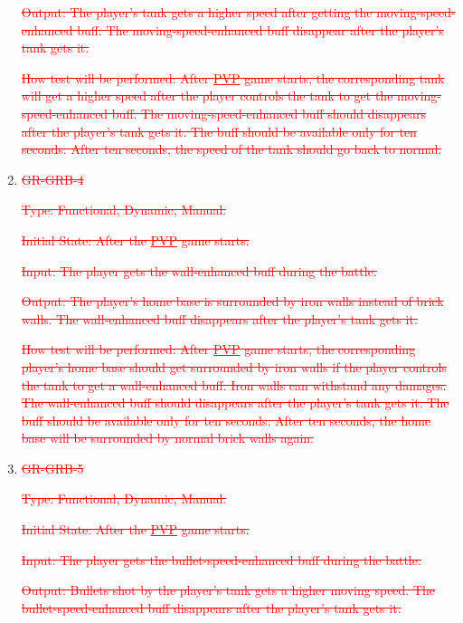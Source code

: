 \documentclass[12pt, titlepage]{article}
\begin{document}
\begin{enumerate}
\textcolor{red}{\sout{Output: The player's tank gets a higher speed after getting the moving-speed-enhanced buff. The moving-speed-enhanced buff disappear after the player's tank gets it.}}
					
\textcolor{red}{\sout{How test will be performed: After \underline{PVP} game starts, the corresponding tank will get a higher speed after the player controls the tank to get the moving-speed-enhanced buff. The moving-speed-enhanced buff should disappears after the player's tank gets it. The buff should be available only for ten seconds. After ten seconds, the speed of the tank should go back to normal.}}


\item{\textcolor{red}{\sout{GR-GRB-4}}\\}

\textcolor{red}{\sout{Type: Functional, Dynamic, Manual.}}
					
\textcolor{red}{\sout{Initial State: After the \underline{PVP} game starts. }}
					
\textcolor{red}{\sout{Input: The player gets the wall-enhanced buff during the battle.}}
					
\textcolor{red}{\sout{Output: The player's home base is surrounded by iron walls instead of brick walls. The wall-enhanced buff disappears after the player's tank gets it.}}
					
\textcolor{red}{\sout{How test will be performed: After \underline{PVP} game starts, the corresponding player's home base should get surrounded by iron walls if the player controls the tank to get a wall-enhanced buff. Iron walls can withstand any damages. The wall-enhanced buff should disappears after the player's tank gets it. The buff should be available only for ten seconds. After ten seconds, the home base will be surrounded by normal brick walls again.}}

\item{\textcolor{red}{\sout{GR-GRB-5}}\\}

\textcolor{red}{\sout{Type: Functional, Dynamic, Manual.}}
					
\textcolor{red}{\sout{Initial State: After the \underline{PVP} game starts. }}
					
\textcolor{red}{\sout{Input: The player gets the bullet-speed-enhanced buff during the battle.}}
					
\textcolor{red}{\sout{Output: Bullets shot by the player's tank gets a higher moving speed. The bullet-speed-enhanced buff disappears after the player's tank gets it.}}
					

\end{enumerate}
\end{document}
